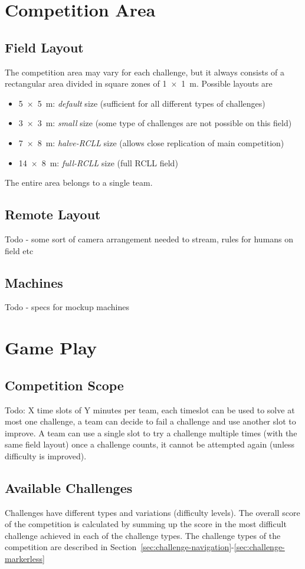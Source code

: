 \documentclass[12pt,twoside]{article}
\newcommand{\refsec}[1]{Section~\ref{#1}}
\begin{document}
\section{Competition Area}
\subsection{Field Layout}
The competition area may vary for each challenge, but it always consists of
a rectangular area divided in square zones of \SI{1 x 1}{\metre}.
Possible layouts are
\begin{itemize}
\item \SI{5 x 5}{\metre}: \emph{default} size
	(sufficient for all different types of challenges)
\item \SI{3 x 3}{\metre}: \emph{small} size
	(some type of challenges are not possible on this field)
\item \SI{7 x 8}{\metre}: \emph{halve-RCLL} size
	(allows close replication of main competition)
\item \SI{14 x 8}{\metre}: \emph{full-RCLL} size
	(full RCLL field)
\end{itemize}

The entire area belongs to a single team.
\subsection{Remote Layout}
Todo - some sort of camera arrangement needed to stream, rules for humans on field etc
\subsection{Machines}
Todo - specs for mockup machines
\section{Game Play}
\subsection{Competition Scope}
Todo: X time slots of Y minutes per team, each timeslot can be used to solve
at most one challenge, a team can decide to fail a challenge and use another slot to improve.
A team can use a single slot to try a challenge multiple times (with the same field layout)
once a challenge counts, it cannot be attempted again (unless difficulty is improved).

\subsection{Available Challenges}
Challenges have different types and variations (difficulty levels).
The overall score of the competition is calculated by summing up the score
in the most difficult challenge achieved in each of the challenge types.
The challenge types of the competition are described in
\refsec{sec:challenge-navigation}-\ref{sec:challenge-markerless}
\end{document}
